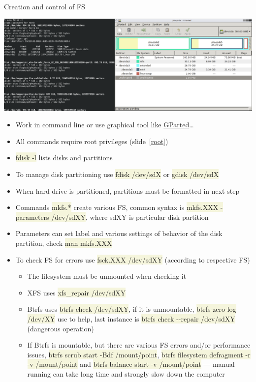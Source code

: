 \documentclass[compress, ucs, xelatex, 11pt, xcolor=svgnames, aspectratio=169,
	hyperref={
		bookmarks=true,
		unicode=true,
		colorlinks=true,
		pdftitle={Linux, command line and MetaCentrum},
		plainpages=false,
		pdfauthor={Vojtech Zeisek},
		pdfsubject={Course about use of Linux command line, writing shell scripts and using MetaCentrum of CESNET},
		pdfcreator={XeLaTeX},
		pdfkeywords={Linux, GNU, BASH, shell, command line, MetaCentrum},
		linkcolor=DarkRed, %
		anchorcolor=DarkBlue, %
		citecolor=Indigo, %
		filecolor=NavyBlue, %
		menucolor=DarkMagenta, %
		urlcolor=DarkBlue, %
		pdftex},
	url={hyphens, lowtilde} %
	]{beamer}
\renewcommand{\texttt}[1]{\colorbox{Beige}{{\ttfamily #1}}}
\begin{document}
\begin{frame}[allowframebreaks]{Creation and control of FS}
	\begin{center}
		\includegraphics[width=\textwidth]{disks.png}
	\end{center}
	\begin{itemize}
		\item Work in command line or use graphical tool like \href{https://gparted.org/}{GParted}\ldots
		\item All commands require root privileges (slide~\ref{root})
		\item \texttt{fdisk -l} lists disks and partitions
		\item To manage disk partitioning use \texttt{fdisk /dev/sdX} or \texttt{gdisk /dev/sdX}
		\item When hard drive is partitioned, partitions must be formatted in next step
		\item Commands \texttt{mkfs.*} create various FS, common syntax is \texttt{mkfs.XXX -parameters /dev/sdXY}, where sdXY is particular disk partition
		\item Parameters can set label and various settings of behavior of the disk partition, check \texttt{man mkfs.XXX}
		\item To check FS for errors use \texttt{fsck.XXX /dev/sdXY} (according to respective FS)
		\begin{itemize}
			\item The filesystem must be unmounted when checking it
			\item XFS uses \texttt{xfs\_repair /dev/sdXY}
			\item Btrfs uses \texttt{btrfs check /dev/sdXY}, if it is unmountable, \texttt{btrfs-zero-log /dev/XY} use to help, last instance is \texttt{btrfs check -{-}repair /dev/sdXY} (dangerous operation)
			\item If Btrfs is mountable, but there are various FS errors and/or performance issues, \texttt{btrfs scrub start -Bdf /mount/point}, \texttt{btrfs filesystem defragment -r -v /mount/point} and \texttt{btrfs balance start -v /mount/point} --- manual running can take long time and strongly slow down the computer

\end{itemize}
\end{itemize}
\end{frame}
\end{document}
